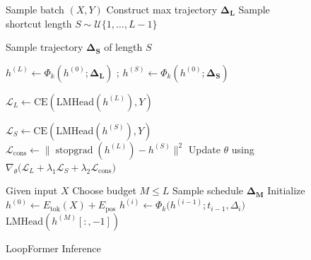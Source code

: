 \begin{figure}[t]
\centering
\begin{minipage}[t]{0.56\textwidth}
\begin{algorithm}[H]
\caption{LoopFormer Training}
\label{alg:training}
\begin{algorithmic}
  \State Sample batch $(X, Y)$
  \State Construct max trajectory $\boldsymbol{\Delta_L}$
  \State Sample shortcut length $S \sim \mathcal{U}\{1, \ldots, L-1\}$
  
  \State Sample trajectory $\boldsymbol{\Delta_S}$ of length $S$

  \State $h^{(L)} \gets \Phi_k(h^{(0)};\boldsymbol{\Delta_L})$ \;; $h^{(S)} \gets \Phi_k(h^{(0)};\boldsymbol{\Delta_S})$
  
  \State $\mathcal{L}_L \gets \mathrm{CE}(\mathrm{LMHead}(h^{(L)}), Y)$
  
  \State $\mathcal{L}_S \gets \mathrm{CE}(\mathrm{LMHead}(h^{(S)}), Y)$
  \State $\mathcal{L}_{\mathrm{cons}} \gets 
         \| \operatorname{stopgrad}(h^{(L)}) - h^{(S)} \|^2$
  \State Update $\theta$ using $\nabla_\theta\big(\mathcal{L}_L + \lambda_1 \mathcal{L}_S + \lambda_2 \mathcal{L}_{\mathrm{cons}}\big)$
\EndWhile
\end{algorithmic}
\end{algorithm}
\end{minipage}
\hfill
\begin{minipage}[t]{0.40\textwidth}
\begin{algorithm}[H]
\caption{LoopFormer Inference}
\label{alg:inference}
\begin{algorithmic}
\State Given input $X$ 
\State Choose budget $M \le L$
\State Sample schedule $\boldsymbol{\Delta_M}$
\State Initialize $h^{(0)} \gets E_{\mathrm{tok}}(X) + E_{\mathrm{pos}}$
  \State $h^{(i)} \gets \Phi_k\!\big(h^{(i-1)}; t_{i-1}, \Delta_i\big)$
\EndFor
\State \Return $\mathrm{LMHead}(h^{(M)}[:,-1])$
\end{algorithmic}
\end{algorithm}
\end{minipage}
\end{figure}






